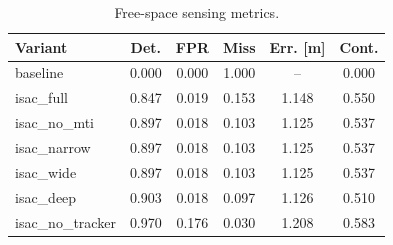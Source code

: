 \begin{table}[t]
    \centering
    \caption{Free-space sensing metrics.}
    \label{tab:exp1_fs_sense}
    \footnotesize
    \begin{tabular}{lccccc}
        \hline
        Variant           & Det.  & FPR   & Miss  & Err. [m] & Cont. \\
        \hline
        baseline          & 0.000 & 0.000 & 1.000 & --       & 0.000 \\
        isac\_full        & 0.847 & 0.019 & 0.153 & 1.148    & 0.550 \\
        isac\_no\_mti     & 0.897 & 0.018 & 0.103 & 1.125    & 0.537 \\
        isac\_narrow      & 0.897 & 0.018 & 0.103 & 1.125    & 0.537 \\
        isac\_wide        & 0.897 & 0.018 & 0.103 & 1.125    & 0.537 \\
        isac\_deep        & 0.903 & 0.018 & 0.097 & 1.126    & 0.510 \\
        isac\_no\_tracker & 0.970 & 0.176 & 0.030 & 1.208    & 0.583 \\
        \hline
    \end{tabular}
\end{table}